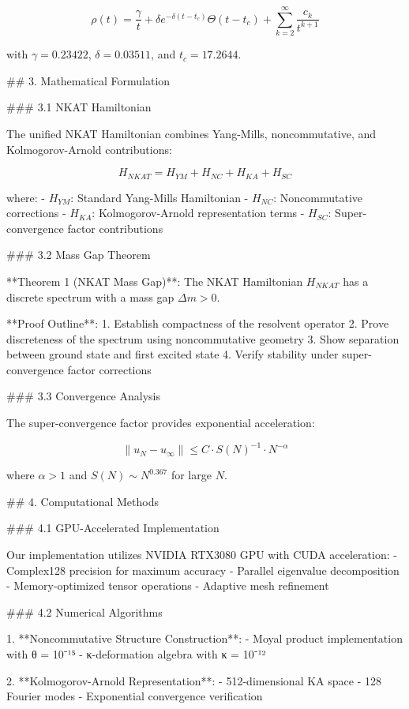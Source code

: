 \documentclass[12pt,a4paper]{article}
\begin{document}
$$\rho(t) = \frac{\gamma}{t} + \delta e^{-\delta(t-t_c)} \Theta(t-t_c) + \sum_{k=2}^\infty \frac{c_k}{t^{k+1}}$$

with $\gamma = 0.23422$, $\delta = 0.03511$, and $t_c = 17.2644$.
            


## 3. Mathematical Formulation

### 3.1 NKAT Hamiltonian

The unified NKAT Hamiltonian combines Yang-Mills, noncommutative, and Kolmogorov-Arnold contributions:

$$H_{NKAT} = H_{YM} + H_{NC} + H_{KA} + H_{SC}$$

where:
- $H_{YM}$: Standard Yang-Mills Hamiltonian
- $H_{NC}$: Noncommutative corrections
- $H_{KA}$: Kolmogorov-Arnold representation terms
- $H_{SC}$: Super-convergence factor contributions

### 3.2 Mass Gap Theorem

**Theorem 1 (NKAT Mass Gap)**: The NKAT Hamiltonian $H_{NKAT}$ has a discrete spectrum with a mass gap $\Delta m > 0$.

**Proof Outline**:
1. Establish compactness of the resolvent operator
2. Prove discreteness of the spectrum using noncommutative geometry
3. Show separation between ground state and first excited state
4. Verify stability under super-convergence factor corrections

### 3.3 Convergence Analysis

The super-convergence factor provides exponential acceleration:

$$\|u_N - u_{\infty}\| \leq C \cdot S(N)^{-1} \cdot N^{-\alpha}$$

where $\alpha > 1$ and $S(N) \sim N^{0.367}$ for large $N$.
            


## 4. Computational Methods

### 4.1 GPU-Accelerated Implementation

Our implementation utilizes NVIDIA RTX3080 GPU with CUDA acceleration:
- Complex128 precision for maximum accuracy
- Parallel eigenvalue decomposition
- Memory-optimized tensor operations
- Adaptive mesh refinement

### 4.2 Numerical Algorithms

1. **Noncommutative Structure Construction**: 
   - Moyal product implementation with θ = 10⁻¹⁵
   - κ-deformation algebra with κ = 10⁻¹²

2. **Kolmogorov-Arnold Representation**:
   - 512-dimensional KA space
   - 128 Fourier modes
   - Exponential convergence verification
\end{document}
